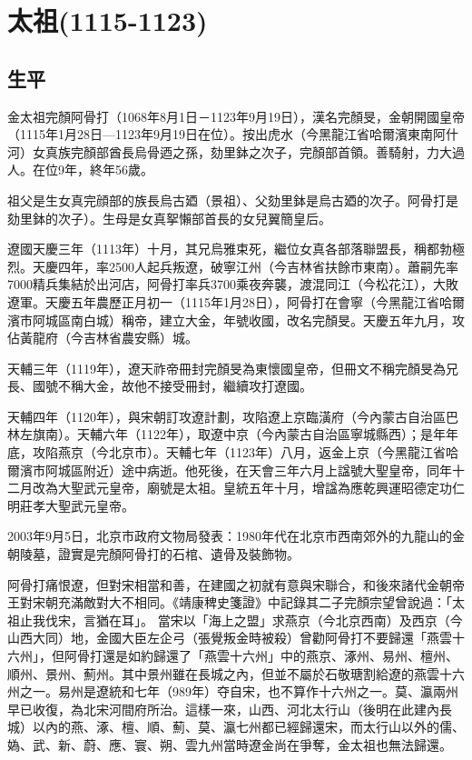 
\section{太祖\tiny(1115-1123)}

\subsection{生平}

金太祖完顏阿骨打（1068年8月1日－1123年9月19日），漢名完顏旻，金朝開國皇帝（1115年1月28日—1123年9月19日在位）。按出虎水（今黑龍江省哈爾濱東南阿什河）女真族完顏部酋長烏骨迺之孫，劾里鉢之次子，完顏部首領。善騎射，力大過人。在位9年，終年56歲。

祖父是生女真完顔部的族長烏古廼（景祖）、父劾里鉢是烏古廼的次子。阿骨打是劾里鉢的次子）。生母是女真挐懶部首長的女兒翼簡皇后。

遼國天慶三年（1113年）十月，其兄烏雅束死，繼位女真各部落聯盟長，稱都勃極烈。天慶四年，率2500人起兵叛遼，破寧江州（今吉林省扶餘市東南）。蕭嗣先率7000精兵集結於出河店，阿骨打率兵3700乘夜奔襲，渡混同江（今松花江），大敗遼軍。天慶五年農歷正月初一（1115年1月28日），阿骨打在會寧（今黑龍江省哈爾濱市阿城區南白城）稱帝，建立大金，年號收國，改名完顏旻。天慶五年九月，攻佔黃龍府（今吉林省農安縣）城。

天輔三年（1119年），遼天祚帝冊封完顏旻為東懷國皇帝，但冊文不稱完顏旻為兄長、國號不稱大金，故他不接受冊封，繼續攻打遼國。

天輔四年（1120年），與宋朝訂攻遼計劃，攻陷遼上京臨潢府（今內蒙古自治區巴林左旗南）。天輔六年（1122年），取遼中京（今內蒙古自治區寧城縣西）；是年年底，攻陷燕京（今北京市）。天輔七年（1123年）八月，返金上京（今黑龍江省哈爾濱市阿城區附近）途中病逝。他死後，在天會三年六月上諡號大聖皇帝，同年十二月改為大聖武元皇帝，廟號是太祖。皇統五年十月，增諡為應乾興運昭德定功仁明莊孝大聖武元皇帝。

2003年9月5日，北京市政府文物局發表：1980年代在北京市西南郊外的九龍山的金朝陵墓，證實是完顏阿骨打的石棺、遺骨及裝飾物。

阿骨打痛恨遼，但對宋相當和善，在建國之初就有意與宋聯合，和後來諸代金朝帝王對宋朝充滿敵對大不相同。《靖康稗史箋證》中記錄其二子完顏宗望曾說過：「太祖止我伐宋，言猶在耳」。 當宋以「海上之盟」求燕京（今北京西南）及西京（今山西大同）地，金國大臣左企弓（張覺叛金時被殺）曾勸阿骨打不要歸還「燕雲十六州」，但阿骨打還是如約歸還了「燕雲十六州」中的燕京、涿州、易州、檀州、順州、景州、薊州。其中景州雖在長城之內，但並不屬於石敬瑭割給遼的燕雲十六州之一。易州是遼統和七年（989年）夺自宋，也不算作十六州之一。莫、瀛兩州早已收復，為北宋河間府所治。這樣一來，山西、河北太行山（後明在此建內長城）以內的燕、涿、檀、順、薊、莫、瀛七州都已經歸還宋，而太行山以外的儒、媯、武、新、蔚、應、寰、朔、雲九州當時遼金尚在爭奪，金太祖也無法歸還。

